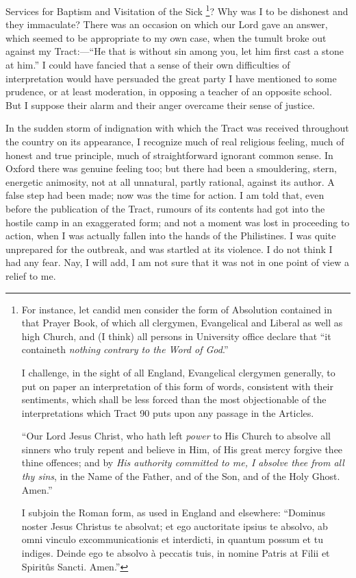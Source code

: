 Services for Baptism and Visitation of the Sick \footnote{For instance, let candid men consider the
form of Absolution contained in that Prayer Book, of which all
clergymen, Evangelical and Liberal as well as high Church, and (I
think) all persons in University office declare that ``it
containeth \emph{nothing contrary to the Word of God}.''

I challenge, in the sight of all England, Evangelical clergymen
generally, to put on paper an interpretation of this form of words,
consistent with their sentiments, which shall be less forced than the
most objectionable of the interpretations which Tract 90 puts upon any
passage in the Articles.

``Our Lord Jesus Christ, who hath left \emph{power} to His Church
to absolve all sinners who truly repent and believe in Him, of His great
mercy forgive thee thine offences; and by \emph{His authority committed to
me, I absolve thee from all thy sins}, in the Name of the Father, and
of the Son, and of the Holy Ghost. Amen.''

I subjoin the Roman form, as used in England and elsewhere: ``Dominus
noster Jesus Christus te absolvat; et ego auctoritate ipsius te absolvo,
ab omni vinculo excommunicationis et interdicti, in quantum possum et tu
indiges. Deinde ego te absolvo à peccatis tuis, in nomine Patris at
Filii et Spiritûs Sancti. Amen.''}? Why was I to
be dishonest and they immaculate? There was an occasion on which our
Lord gave an answer, which seemed to be appropriate to my own case, when
the tumult broke out against my Tract:—``He that is without
sin among you, let him first cast a stone at him.'' I could have
fancied that a sense of their own difficulties of interpretation would
have persuaded the great party I have mentioned to some prudence, or at
least moderation, in opposing a teacher of an opposite school. But I
suppose their alarm and their anger overcame their sense of justice.

In the sudden storm of indignation with which the Tract
was received throughout the country on its appearance, I
recognize much of real religious feeling, much of honest and true
principle, much of straightforward ignorant common sense. In Oxford
there was genuine feeling too; but there had been a smouldering, stern,
energetic animosity, not at all unnatural, partly rational, against its
author. A false step had been made; now was the time for action. I am
told that, even before the publication of the Tract, rumours of its
contents had got into the hostile camp in an exaggerated form; and not a
moment was lost in proceeding to action, when I was actually fallen into the hands of the Philistines. I was quite
unprepared for the outbreak, and was startled at its violence. I do not
think I had any fear. Nay, I will add, I am not sure that it was not in
one point of view a relief to me.

